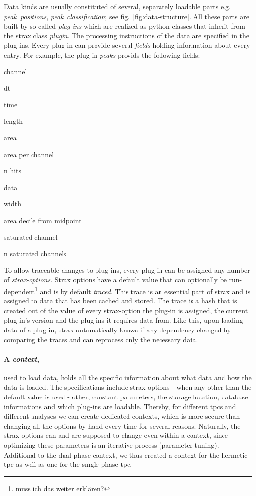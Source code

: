 Data kinds are usually constituted of several, separately loadable parts e.g. \emph{peak~positions}, \emph{peak~classification}; see fig.~\ref{fig:data-structure}.
All these parts are built by so called \emph{plug-ins} which are realized as python classes that inherit from the strax class \emph{plugin}.
The processing instructions of the data are specified in the plug-ins.
Every plug-in can provide several \emph{fields} holding information about every entry.
For example, the plug-in \emph{peaks} provids the following fields:
\begin{AutoMultiColItemize}
        \item{channel}
        \item{dt}
        \item{time}
        \item{length}
        \item{area}
        \item{area per channel}
        \item{n hits}
        \item{data}
        \item{width}
        \item{area decile from midpoint}
        \item{saturated channel}
        \item{n saturated channels}
\end{AutoMultiColItemize}
To allow traceable changes to plug-ins, every plug-in can be assigned any number of \emph{strax-options}.
Strax options have a default value that can optionally be run-dependent\footnote{muss ich das weiter erklären?} and is by default \emph{traced}.
This trace is an essential part of strax and is assigned to data that has been cached and stored.
The trace is a hash that is created out of the value of every strax-option the plug-in is assigned, the current plug-in's version and the plug-ins it requires data from.
Like this, upon loading data of a plug-in, strax automatically knows if any dependency changed by comparing the traces and can reprocess only the necessary data.

\paragraph{A \emph{context},} used to load data, holds all the specific information about what data and how the data is loaded.
The specifications include strax-options - when any other than the default value is used - other, constant parameters, the storage location, database informations and which plug-ins are loadable.
Thereby, for different \glspl{tpc} and different analyses we can create dedicated contexts, which is more secure than changing all the options by hand every time for several reasons.
Naturally, the strax-options can and are supposed to change even within a context, since optimizing these parameters is an iterative process (parameter tuning).
Additional to the dual phase context, we thus created a context for the hermetic \gls{tpc} as well as one for the single phase \gls{tpc}.

